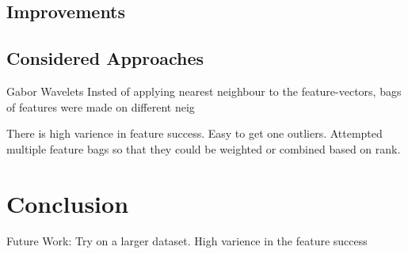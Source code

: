 \documentclass[conference]{IEEEtran} %
\begin{document}
\subsection{Improvements}


\subsection{Considered Approaches}
Gabor Wavelets
Insted of applying nearest neighbour to the feature-vectors, bags of features were made on different neig

There is high varience in feature success. Easy to get one outliers. Attempted multiple feature bags so that they could be weighted or combined based on rank.


\section{Conclusion}

Future Work: Try on a larger dataset. High varience in the feature success 




\end{document}
